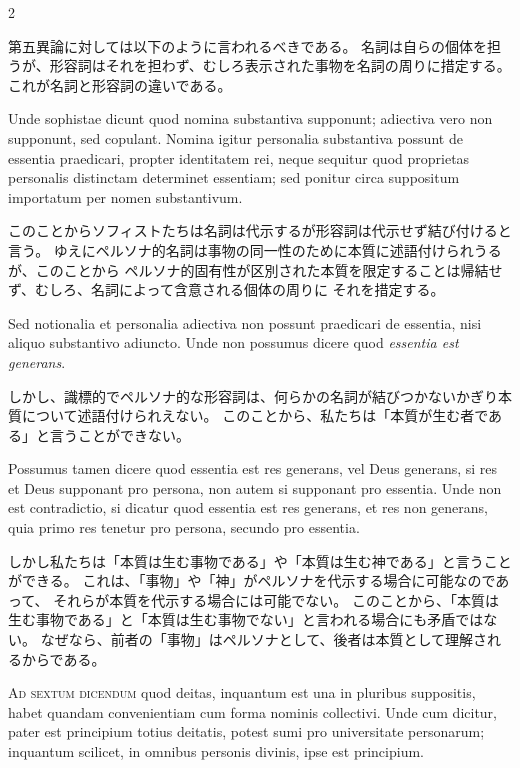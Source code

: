 \documentclass[paper=a4paper,fontsize=10pt,jafontsize=9pt,titlepage]{jlreq}
\begin{document}
\begin{paracol}{2}
\switchcolumn

第五異論に対しては以下のように言われるべきである。
名詞は自らの個体を担うが、形容詞はそれを担わず、むしろ表示された事物を名詞の周りに措定する。
これが名詞と形容詞の違いである。

\switchcolumn*

Unde sophistae dicunt quod
nomina substantiva supponunt; adiectiva vero non supponunt, sed copulant.
Nomina igitur personalia substantiva possunt de essentia praedicari, propter
identitatem rei, neque sequitur quod proprietas personalis distinctam
determinet essentiam; sed ponitur circa suppositum importatum per nomen
substantivum.

\switchcolumn

このことからソフィストたちは名詞は代示するが形容詞は代示せず結び付けると言う。
ゆえにペルソナ的名詞は事物の同一性のために本質に述語付けられうるが、このことから
ペルソナ的固有性が区別された本質を限定することは帰結せず、むしろ、名詞によって含意される個体の周りに
それを措定する。

\switchcolumn*

Sed notionalia et personalia adiectiva non possunt praedicari de
essentia, nisi aliquo substantivo adiuncto. Unde non possumus dicere quod
\textit{essentia est generans}.

\switchcolumn

しかし、識標的でペルソナ的な形容詞は、何らかの名詞が結びつかないかぎり本質について述語付けられえない。
このことから、私たちは「本質が生む者である」と言うことができない。

\switchcolumn*

Possumus tamen dicere quod essentia est res generans,
vel Deus generans, si res et Deus supponant pro persona, non autem si supponant
pro essentia. Unde non est contradictio, si dicatur quod essentia est res
generans, et res non generans, quia primo res tenetur pro persona, secundo pro
essentia.

\switchcolumn

しかし私たちは「本質は生む事物である」や「本質は生む神である」と言うことができる。
これは、「事物」や「神」がペルソナを代示する場合に可能なのであって、
それらが本質を代示する場合には可能でない。
このことから、「本質は生む事物である」と「本質は生む事物でない」と言われる場合にも矛盾ではない。
なぜなら、前者の「事物」はペルソナとして、後者は本質として理解されるからである。

\switchcolumn*

\textsc{Ad sextum dicendum} quod deitas, inquantum est una in pluribus suppositis, habet
quandam convenientiam cum forma nominis collectivi. Unde cum dicitur, pater est
principium totius deitatis, potest sumi pro universitate personarum; inquantum
scilicet, in omnibus personis divinis, ipse est principium.


\end{paracol}
\end{document}
